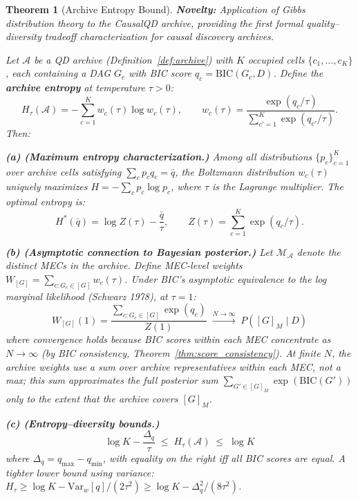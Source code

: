 \documentclass{article}
\theoremstyle{definition}
\theoremstyle{plain}
\newtheorem{theorem}{Theorem}
\theoremstyle{remark}
\begin{document}
\begin{theorem}[Archive Entropy Bound]
\label{thm:archive_entropy}
\textbf{Novelty:} Application of Gibbs distribution theory to the CausalQD archive,
providing the first formal quality--diversity tradeoff characterization for causal
discovery archives.

Let $\mathcal{A}$ be a QD archive (Definition~\ref{def:archive}) with $K$ occupied cells
$\{c_1, \ldots, c_K\}$, each containing a DAG $G_c$ with BIC score $q_c = \mathrm{BIC}(G_c, D)$.
Define the \textbf{archive entropy} at temperature $\tau > 0$:
\begin{equation}
  H_\tau(\mathcal{A}) = -\sum_{c=1}^{K} w_c(\tau) \log w_c(\tau), \qquad
  w_c(\tau) = \frac{\exp(q_c / \tau)}{\sum_{c'=1}^{K} \exp(q_{c'} / \tau)}.
\end{equation}
Then:

\textbf{(a) (Maximum entropy characterization.)} Among all distributions $\{p_c\}_{c=1}^K$
over archive cells satisfying $\sum_c p_c q_c = \bar{q}$, the Boltzmann distribution
$w_c(\tau)$ uniquely maximizes $H = -\sum_c p_c \log p_c$, where $\tau$ is the Lagrange
multiplier. The optimal entropy is:
\begin{equation}
  H^*(\bar{q}) = \log Z(\tau) - \frac{\bar{q}}{\tau}, \qquad
  Z(\tau) = \sum_{c=1}^K \exp(q_c/\tau).
\end{equation}

\textbf{(b) (Asymptotic connection to Bayesian posterior.)} Let $\mathcal{M}_\mathcal{A}$
denote the distinct MECs in the archive. Define MEC-level weights
$W_{[G]} = \sum_{c : G_c \in [G]} w_c(\tau)$. Under BIC's asymptotic equivalence to the
log marginal likelihood (Schwarz 1978), at $\tau = 1$:
\begin{equation}
  W_{[G]}(1) = \frac{\sum_{c : G_c \in [G]} \exp(q_c)}{Z(1)}
  \;\xrightarrow{N \to \infty}\; P([G]_M \mid D)
\end{equation}
where convergence holds because BIC scores within each MEC concentrate as $N \to \infty$
(by BIC consistency, Theorem~\ref{thm:score_consistency}). At finite $N$, the archive
weights use a \emph{sum} over archive representatives within each MEC, not a max;
this sum approximates the full posterior sum $\sum_{G' \in [G]_M} \exp(\mathrm{BIC}(G'))$
only to the extent that the archive covers $[G]_M$.

\textbf{(c) (Entropy--diversity bounds.)}
\begin{equation}
  \log K - \frac{\Delta_q}{\tau} \;\leq\; H_\tau(\mathcal{A}) \;\leq\; \log K
\end{equation}
where $\Delta_q = q_{\max} - q_{\min}$, with equality on the right iff all BIC scores are
equal. A tighter lower bound using variance:
$H_\tau \geq \log K - \mathrm{Var}_w[q]/(2\tau^2) \geq \log K - \Delta_q^2/(8\tau^2)$.
\end{theorem}
\end{document}
